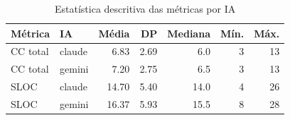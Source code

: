 \begin{table}[ht]
\centering
\caption{Estatística descritiva das métricas por IA}
\label{tab:descritiva}
\begin{tabular}{llrrrrr}
\hline
Métrica & IA & Média & DP & Mediana & Mín. & Máx. \\ \hline
CC total & claude & 6.83 & 2.69 & 6.0 & 3 & 13 \\
CC total & gemini & 7.20 & 2.75 & 6.5 & 3 & 13 \\
SLOC & claude & 14.70 & 5.40 & 14.0 & 4 & 26 \\
SLOC & gemini & 16.37 & 5.93 & 15.5 & 8 & 28 \\
\hline
\end{tabular}
\end{table}